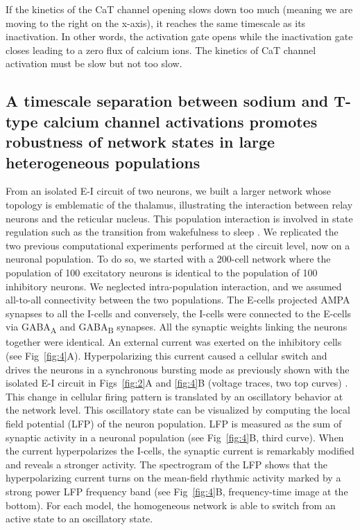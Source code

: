 If the kinetics of the CaT channel opening slows down too much (meaning we are moving to the right on the x-axis), it reaches the same timescale as its inactivation. In other words, the activation gate opens while the inactivation gate closes leading to a zero flux of calcium ions. The kinetics of CaT channel activation must be slow but not too slow.

\subsection{A timescale separation between sodium and T-type calcium channel activations promotes robustness of network states in large heterogeneous populations}
From an isolated E-I circuit of two neurons, we built a larger network whose topology is emblematic of the thalamus, illustrating the interaction between relay neurons and the reticular nucleus. This population interaction is involved in state regulation such as the transition from wakefulness to sleep \citep{mccormick_sleep_1997, murray_sherman_tonic_2001}. We replicated the two previous computational experiments performed at the circuit level, now on a neuronal population. To do so, we started with a 200-cell network where the population of 100 excitatory neurons  is identical to the population of 100 inhibitory neurons. We neglected intra-population interaction, and we assumed all-to-all connectivity between the two populations. The E-cells projected AMPA synapses to all the I-cells and conversely, the I-cells were connected to the E-cells via GABA\textsubscript{A} and GABA\textsubscript{B} synapses. All the synaptic weights linking the neurons together were identical. An external current was exerted on the inhibitory cells (see Fig~\ref{fig:4}A). Hyperpolarizing this current caused a cellular switch and drives the neurons in a synchronous bursting mode as previously shown with the isolated E-I circuit in Figs~\ref{fig:2}A and \ref{fig:4}B (voltage traces,  two top curves) \citep{drion_switchable_2018}. This change in cellular firing pattern is translated by an oscillatory behavior at the network level. This oscillatory state can be visualized by computing the local field potential (LFP) of the neuron population.  LFP is measured as the sum of synaptic activity in a neuronal population (see Fig~\ref{fig:4}B,  third curve). When the current hyperpolarizes the I-cells, the synaptic current is remarkably modified and reveals a stronger activity. The spectrogram of the LFP shows that the hyperpolarizing current turns on the mean-field rhythmic activity marked by a strong power LFP frequency band (see Fig~\ref{fig:4}B, frequency-time image at the bottom). For each model, the homogeneous network is able to switch from an active state to an oscillatory state. 

